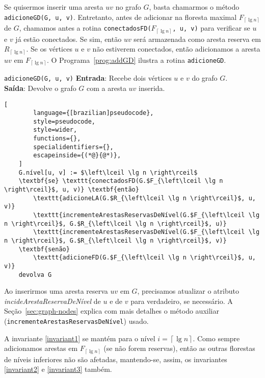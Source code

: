 Se quisermos inserir uma aresta $uv$ no grafo $G$, basta chamarmos o método \texttt{adicioneGD(G, u, v)}. Entretanto, antes de adicionar na floresta maximal $F_{\left\lceil \lg n \right\rceil}$ de $G$, chamamos antes a rotina \texttt{conectadosFD($F_{\left\lceil \lg n \right\rceil}$, u, v)} para verificar se $u$ e $v$ já estão conectados. Se sim, então $uv$ será armazenada como aresta reserva em $R_{\left\lceil \lg n \right\rceil}$. Se os vértices $u$ e $v$ não estiverem conectados, então adicionamos a aresta $uv$ em $F_{\left\lceil \lg n \right\rceil}$. O Programa~\ref{prog:addGD} ilustra a rotina \texttt{adicioneGD}.

\begin{programruledcaption}{\texttt{adicioneGD(G, u, v)} \label{prog:addGD}}
    \noindent\textbf{Entrada}: Recebe dois vértices $u$ e $v$ do grafo $G$. \\
    \textbf{Saída}: Devolve o grafo $G$ com a aresta $uv$ inserida.
    \vspace{-0.5\baselineskip}
    \begin{lstlisting}[
        language={[brazilian]pseudocode},
        style=pseudocode,
        style=wider,
        functions={},
        specialidentifiers={},
        escapeinside={(*@}{@*)},
    ]
    G.nível[u, v] := $\left\lceil \lg n \right\rceil$
    \textbf{se} \texttt{conectadosFD(G.$F_{\left\lceil \lg n \right\rceil}$, u, v)} \textbf{então}
        \texttt{adicioneLA(G.$R_{\left\lceil \lg n \right\rceil}$, u, v)}
        \texttt{incrementeArestasReservasDeNível(G.$F_{\left\lceil \lg n \right\rceil}$, G.$R_{\left\lceil \lg n \right\rceil}$, u)}
        \texttt{incrementeArestasReservasDeNível(G.$F_{\left\lceil \lg n \right\rceil}$, G.$R_{\left\lceil \lg n \right\rceil}$, v)}
    \textbf{senão}
        \texttt{adicioneFD(G.$F_{\left\lceil \lg n \right\rceil}$, u, v)}
    devolva G
    \end{lstlisting}
    \vspace{-0.5\baselineskip}
\end{programruledcaption}

Ao inserirmos uma aresta reserva $uv$ em $G$, precisamos atualizar o atributo \textit{incideArestaReservaDeNível} de $u$ e de $v$ para verdadeiro, se necessário. A Seção~\ref{sec:graph-nodes} explica com mais detalhes o método auxiliar (\texttt{incrementeArestasReservasDeNível}) usado. 

A invariante \ref{invariant1} se mantém para o nível $i = \left\lceil \lg n \right\rceil$. Como sempre adicionamos arestas em $F_{\left\lceil \lg n \right\rceil}$ (se não forem reservas), então as outras florestas de níveis inferiores não são afetadas, mantendo-se, assim, os invariantes \ref{invariant2} e \ref{invariant3} também.

